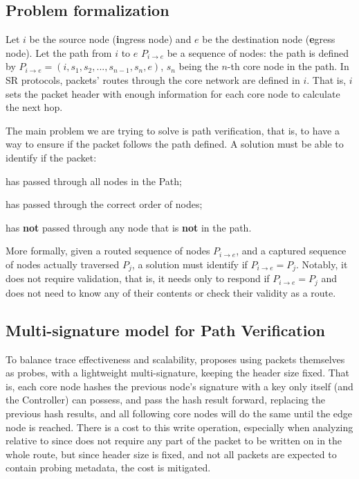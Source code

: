 

\subsection{Problem formalization} \label{sec:formalization}
\newcommand{\Pie}{P_{i \rightarrow e}}

Let $i$ be the source node (\textbf{i}ngress node) and $e$ be the destination node (\textbf{e}gress node). Let the path from $i$ to $e$ $\Pie$ be a sequence of nodes: the path is defined by $ \Pie = (i, s_1, s_2, ..., s_{n - 1}, s_n, e) $\label{eq:path-def}, $s_n$ being the $n$-th core node in the path. In SR protocols, packets' routes through the core network are defined in $i$. That is, $i$ sets the packet header with enough information for each core node to calculate the next hop. 


The main problem we are trying to solve is path verification, that is, to have a way to ensure if the packet follows the path defined. A solution must be able to identify if the packet:
\begin{inlinelist}
    \item has passed through all nodes in the Path;
    \item has passed through the correct order of nodes;
    \item has \textbf{not} passed through any node that is \textbf{not} in the path.
\end{inlinelist}




More formally, given a routed sequence of nodes $P_{i \rightarrow e}$, and a captured sequence of nodes actually traversed $P_j$, a solution must identify if $P_{i \rightarrow e} = P_j$.
Notably, it does not require validation, that is, it needs only to respond if $P_{i \rightarrow e} = P_j$ and does not need to know any of their contents or check their validity as a route.


\subsection{Multi-signature model for Path Verification} \label{sec:multisigmodel}

To balance trace effectiveness and scalability, \pathsec proposes using packets themselves as probes\cite{pathsec}\cite{PINT2020}, with a lightweight multi-signature, keeping the header size fixed. That is, each core node hashes the previous node's signature with a key only itself (and the Controller) can possess, and pass the hash result forward, replacing the previous hash results, and all following core nodes will do the same until the edge node is reached. There is a cost to this write operation, especially when analyzing relative to \polka since \polka does not require any part of the packet to be written on in the whole route, but since header size is fixed, and not all packets are expected to contain probing metadata, the cost is mitigated.

